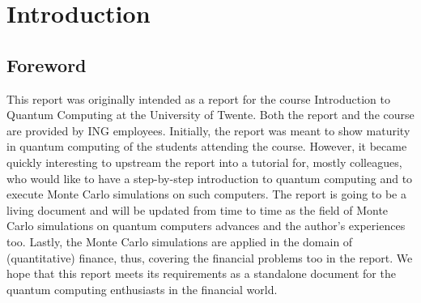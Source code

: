 \documentclass[../main.tex]{subfiles}
\begin{document}
\section{Introduction}\label{sec: introduction}
\subsection*{Foreword}
This report was originally intended as a report for the course Introduction to Quantum Computing at the University of Twente. Both the report and the course are provided by ING employees. Initially, the report was meant to show maturity in quantum computing of the students attending the course. However, it became quickly interesting to upstream the report into a tutorial for, mostly colleagues, who would like to have a step-by-step introduction to quantum computing and to execute Monte Carlo simulations on such computers. The report is going to be a living document and will be updated from time to time as the field of Monte Carlo simulations on quantum computers advances and the author's experiences too. Lastly, the Monte Carlo simulations are applied in the domain of (quantitative) finance, thus, covering the financial problems too in the report. We hope that this report meets its requirements as a standalone document for the quantum computing enthusiasts in the financial world.
\biblio
\end{document}
